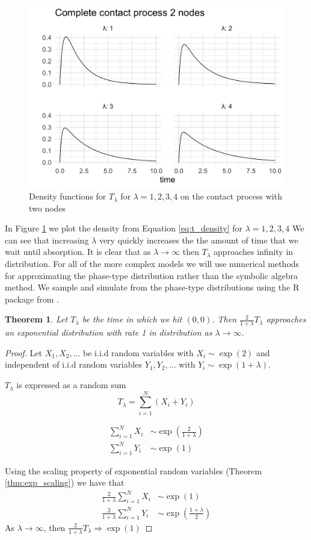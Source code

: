 \documentclass{article}
\theoremstyle{plain}
\newtheorem{theorem}{Theorem}[section]
\theoremstyle{definition}
\theoremstyle{remark}
\numberwithin{equation}{section}
\begin{document}
\begin{figure}
  \centering
    \includegraphics[width=.80\textwidth]{figures/complete_2_contact_phase_densities.png}
   \caption{Density functions for $T_\lambda$ for $\lambda = 1, 2, 3, 4$ on the contact process with two nodes}
  \label{fig:contact_2_phase_densities}
\end{figure}

In Figure \ref{fig:contact_2_phase_densities} we plot the density from Equation \ref{eq:t_density} for $\lambda = 1, 2, 3, 4$ 
We can see that increasing $\lambda$ very quickly increases the the amount of time that we wait until absorption.
It is clear that as $\lambda \to \infty$ then $T_\lambda$ approaches infinity in distribution.
For all of the more complex models we will use numerical methods for approximating the phase-type distribution rather than the symbolic algebra method.
We sample and simulate from the phase-type distributions using the R package from \cite{actuar2008}.

\begin{theorem}
Let $T_\lambda$ be the time in which we hit $(0,0)$.
Then $\frac{2}{1 + \lambda} T_\lambda$ approaches an exponential distribution with rate 1 in distribution as $\lambda \to \infty$.
\end{theorem}

\begin{proof}
Let $X_1, X_2, \ldots$ be i.i.d random variables with
$X_i \sim \exp(2)$ and independent of i.i.d random variables $Y_1, Y_2, \ldots$ with  $Y_i \sim \exp(1 + \lambda)$.

$T_\lambda$ is expressed as a random sum
$$
T_\lambda = \sum_{i = 1}^N (X_i + Y_i)
$$

\begin{align*}
    \sum_{i = 1}^N X_i &\sim \exp\left( \frac{2}{1 + \lambda} \right)\\
    \sum_{i = 1}^N Y_i &\sim \exp( 1 )
\end{align*}

Using the scaling property of exponential random variables (Theorem \ref{thm:exp_scaling}) we have that
\begin{align*}
    \frac{2}{1 + \lambda}\sum_{i = 1}^N X_i &\sim \exp( 1 )\\
    \frac{2}{1 + \lambda}\sum_{i = 1}^N Y_i &\sim \exp \left( \frac{1 + \lambda}{2} \right)
\end{align*}
As $\lambda \to \infty$, then $\frac{2}{1 + \lambda} T_\lambda \Rightarrow \exp(1)$
\end{proof}
\end{document}

